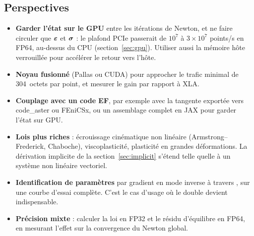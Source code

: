 \subsection{Perspectives}

\begin{itemize}[nosep]
  \item \textbf{Garder l'état sur le GPU} entre les itérations de Newton, et ne faire circuler que $\boldsymbol{\varepsilon}$ et $\boldsymbol{\sigma}$ : le plafond PCIe passerait de $10^7$ à $3\times10^7$ points/s en FP64, au-dessus du CPU (section~\ref{sec:gpu}). Utiliser aussi la mémoire hôte verrouillée pour accélérer le retour vers l'hôte.
  \item \textbf{Noyau fusionné} (Pallas ou CUDA) pour approcher le trafic minimal de 304~octets par point, et mesurer le gain par rapport à XLA.
  \item \textbf{Couplage avec un code EF}, par exemple avec la tangente exportée vers code\_aster ou FEniCSx, ou un assemblage complet en JAX pour garder l'état sur GPU.
  \item \textbf{Lois plus riches} : écrouissage cinématique non linéaire (Armstrong--Frederick, Chaboche), viscoplasticité, plasticité en grandes déformations. La dérivation implicite de la section~\ref{sec:implicit} s'étend telle quelle à un système non linéaire vectoriel.
  \item \textbf{Identification de paramètres} par gradient en mode inverse à travers , sur une courbe d'essai complète. C'est le cas d'usage où le double  devient indispensable.
  \item \textbf{Précision mixte} : calculer la loi en FP32 et le résidu d'équilibre en FP64, en mesurant l'effet sur la convergence du Newton global.
\end{itemize}
